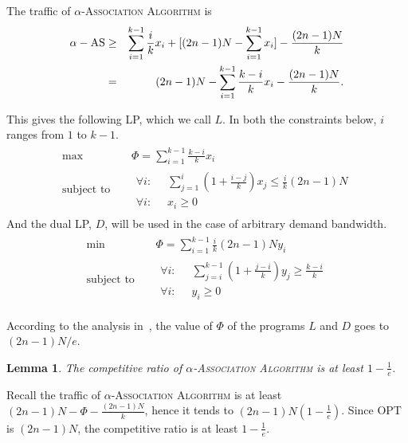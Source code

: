 \documentclass[conference]{IEEEtran}
\newtheorem{lemma}{Lemma}
\begin{document}
  The traffic of {\scshape $\alpha$-Association Algorithm} is
  \begin{eqnarray*}
    \alpha-\rm{AS} &\geq& \sum_{i=1}^{k-1}\frac{i}{k}x_i+[(2n-1)N-\sum_{i=1}^{k-1}x_i]-\frac{(2n-1)N}{k}\\
       & = &(2n-1)N-\sum_{i=1}^{k-1}\frac{k-i}{k}x_i-\frac{(2n-1)N}{k}.
  \end{eqnarray*}

  This gives the following LP, which we call $L$.  In both the constraints below, $i$ ranges from $1$ to $k-1$.
  \begin{eqnarray*}
    \begin{aligned}
        \mbox{max} & \;\;\;\; \Phi=\sum_{i=1}^{k-1}\frac{k-i}{k}x_i \\
        \mbox{subject to}& \;\;\;\;
        \begin{aligned}
          \forall i: \;\; & \sum_{j=1}^{i}(1+\frac{i-j}{k})x_j\leq \frac{i}{k}(2n-1)N\\
          \forall i: \;\; & x_i\geq 0
        \end{aligned}
    \end{aligned}
  \end{eqnarray*}
  And the dual LP, $D$, will be used in the case of arbitrary demand bandwidth.
  \begin{eqnarray*}
    \begin{aligned}
        \mbox{min} & \;\;\;\; \Phi=\sum_{i=1}^{k-1}\frac{i}{k}(2n-1)Ny_i \\
        \mbox{subject to}& \;\;\;\;
        \begin{aligned}
          \forall i: \;\; & \sum_{j=i}^{k-1}(1+\frac{j-i}{k})y_j\geq \frac{k-i}{k}\\
          \forall i: \;\; & y_i\geq 0
        \end{aligned}
    \end{aligned}
  \end{eqnarray*}

  According to the analysis in~\cite{Mehta:2007}, the value of $\Phi$ of the programs $L$ and $D$ goes to $(2n-1)N/e$.

  \begin{lemma}
    The competitive ratio of {\scshape $\alpha$-Association Algorithm} is at least $1-\frac{1}{e}$.
  \end{lemma}
  \begin{IEEEproof}
    Recall the traffic of {\scshape $\alpha$-Association Algorithm} is at least $(2n-1)N-\Phi-\frac{(2n-1)N}{k}$, hence it tends to $(2n-1)N(1-\frac{1}{e})$. Since OPT is $(2n-1)N$, the competitive ratio is at least $1-\frac{1}{e}$.
  \end{IEEEproof}
\end{document}
